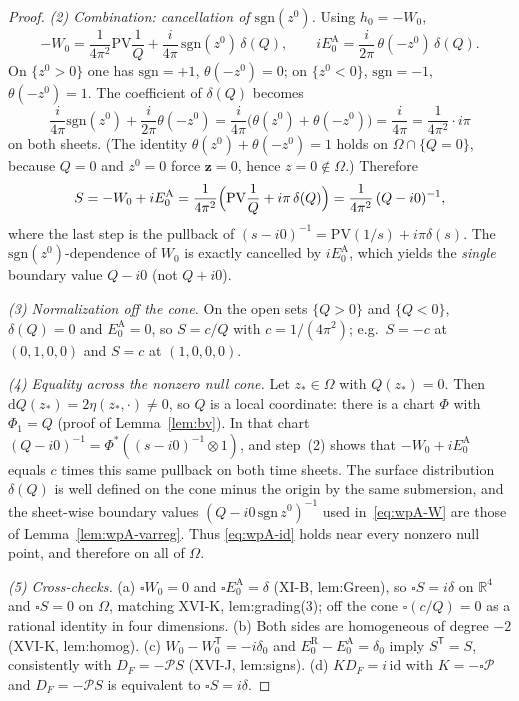 \documentclass{article}
\theoremstyle{remark}
\newcommand{\Pc}{\mathcal P}
\begin{document}
\begin{proof}
\emph{(2) Combination: cancellation of $\mathrm{sgn}(z^0)$.}
Using $h_0=-W_0$,
\[
-W_0=\frac1{4\pi^2}\mathrm{PV}\frac1Q+\frac{i}{4\pi}\,\mathrm{sgn}(z^0)\,\delta(Q),
\qquad
iE_0^{\mathrm A}=\frac{i}{2\pi}\,\theta(-z^0)\,\delta(Q).
\]
On $\{z^0>0\}$ one has $\mathrm{sgn}=+1$, $\theta(-z^0)=0$; on $\{z^0<0\}$, $\mathrm{sgn}=-1$, $\theta(-z^0)=1$.
The coefficient of $\delta(Q)$ becomes
\[
\frac{i}{4\pi}\mathrm{sgn}(z^0)+\frac{i}{2\pi}\theta(-z^0)
=\frac{i}{4\pi}\bigl(\theta(z^0)+\theta(-z^0)\bigr)
=\frac{i}{4\pi}
=\frac1{4\pi^2}\cdot i\pi
\]
on both sheets.
(The identity $\theta(z^0)+\theta(-z^0)=1$ holds on $\Omega\cap\{Q=0\}$, because $Q=0$ and $z^0=0$ force $\mathbf z=0$, hence $z=0\notin\Omega$.)
Therefore
\[
S=-W_0+iE_0^{\mathrm A}
=\frac1{4\pi^2}\Bigl(\mathrm{PV}\frac1Q+i\pi\,\delta(Q)\Bigr)
=\frac1{4\pi^2}\,(Q-i0)^{-1},
\]
where the last step is the pullback of $(s-i0)^{-1}=\mathrm{PV}(1/s)+i\pi\delta(s)$.
The $\mathrm{sgn}(z^0)$-dependence of $W_0$ is exactly cancelled by $iE_0^{\mathrm A}$, which yields the \emph{single} boundary value $Q-i0$ (not $Q+i0$).

\emph{(3) Normalization off the cone.}
On the open sets $\{Q>0\}$ and $\{Q<0\}$, $\delta(Q)=0$ and $E_0^{\mathrm A}=0$, so $S=c/Q$ with $c=1/(4\pi^2)$; e.g.\ $S=-c$ at $(0,1,0,0)$ and $S=c$ at $(1,0,0,0)$.

\emph{(4) Equality across the nonzero null cone.}
Let $z_\ast\in\Omega$ with $Q(z_\ast)=0$.
Then $\mathrm dQ(z_\ast)=2\eta(z_\ast,\cdot)\neq0$, so $Q$ is a local coordinate: there is a chart $\Phi$ with $\Phi_1=Q$ (proof of Lemma~\ref{lem:bv}).
In that chart $(Q-i0)^{-1}=\Phi^*((s-i0)^{-1}\otimes1)$, and step~(2) shows that $-W_0+iE_0^{\mathrm A}$ equals $c$ times this same pullback on both time sheets.
The surface distribution $\delta(Q)$ is well defined on the cone minus the origin by the same submersion, and the sheet-wise boundary values $(Q-i0\,\mathrm{sgn}\,z^0)^{-1}$ used in~\eqref{eq:wpA-W} are those of Lemma~\ref{lem:wpA-varreg}.
Thus \eqref{eq:wpA-id} holds near every nonzero null point, and therefore on all of $\Omega$.

\emph{(5) Cross-checks.}
(a) $\square W_0=0$ and $\square E_0^{\mathrm A}=\delta$ (XI-B, lem:Green), so $\square S=i\delta$ on $\mathbb R^4$ and $\square S=0$ on $\Omega$, matching XVI-K, lem:grading(3); off the cone $\square(c/Q)=0$ as a rational identity in four dimensions.
(b) Both sides are homogeneous of degree $-2$ (XVI-K, lem:homog).
(c) $W_0-W_0^{\mathsf T}=-i\delta_0$ and $E_0^{\mathrm R}-E_0^{\mathrm A}=\delta_0$ imply $S^{\mathsf T}=S$, consistently with $D_F=-\Pc S$ (XVI-J, lem:signs).
(d) $KD_F=i\,\mathrm{id}$ with $K=-\square\Pc$ and $D_F=-\Pc S$ is equivalent to $\square S=i\delta$.
\end{proof}
\end{document}
